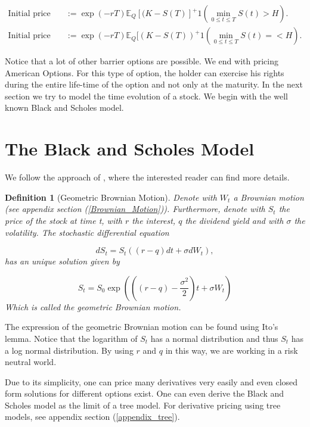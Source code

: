 \documentclass[12pt,a4paper,oneside]{book}
\newtheorem{Definition}{Definition}
\begin{document}
\begin{align}
\text{Initial price DOBP} &:= \exp{(-rT)} \mathbb{E}_{Q}[(K-S(T)]^{+} 1( \min\limits_{0 \leq t \leq T} S(t) > H).  \\
\text{Initial price DIBP} &:= \exp{(-rT)} \mathbb{E}_{Q}[(K-S(T))^{+} 1( \min\limits_{0 \leq t \leq T} S(t) =< H). 
\end{align}

Notice that a lot of other barrier options are possible. We end with pricing American Options. For this type of option, the holder can exercise his rights during the entire life-time of the option and not only at the maturity. In the next section we try to model the time evolution of a stock. We begin with the well known Black and Scholes model. 

\section{The Black and Scholes Model}

We follow the approach of \cite{wimschoutensvg}, where the interested reader can find more details.  

\begin{Definition}[Geometric Brownian Motion]
Denote with $W_t$ a Brownian motion (see appendix section (\ref{Brownian_Motion})). Furthermore, denote with $S_t$ the price of the stock at time t, with $r$ the interest, $q$ the dividend yield and with $\sigma$ the volatility. The stochastic differential equation 

\begin{equation}
dS_t = S_t ((r-q) dt + \sigma dW_t),
\end{equation}
has an unique solution given by

\begin{equation}
S_t = S_0 \exp \left( \left((r-q) - \dfrac{\sigma^2}{2} \right) t + \sigma W_t \right)
\end{equation}
Which is called the geometric Brownian motion.
\end{Definition}

The expression of the geometric Brownian motion can be found using Ito's lemma. Notice that the logarithm of $S_t$ has a normal distribution and thus $S_t$ has a log normal distribution. By using $r$ and $q$ in this way, we are working in a risk neutral world.

Due to its simplicity, one can price many derivatives very easily and even closed form solutions for different options exist. One can even derive the Black and Scholes model as the limit of a tree model. For derivative pricing using tree models, see appendix section (\ref{appendix_tree}). 
\end{document}
